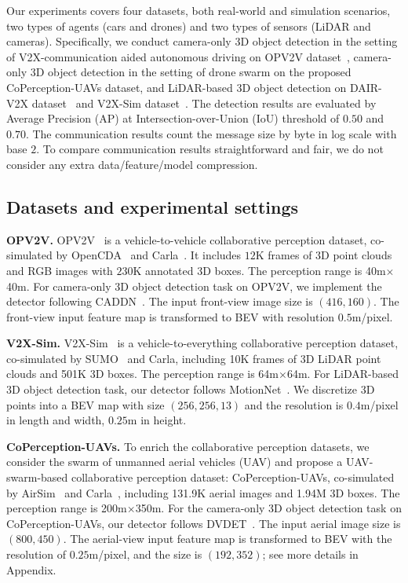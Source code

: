 \documentclass{article}
\begin{document}
Our experiments covers four datasets, both real-world and simulation scenarios, two types of agents (cars and drones) and two types of sensors (LiDAR and cameras). Specifically, we conduct camera-only 3D object detection in the setting of V2X-communication aided autonomous driving on OPV2V dataset~\cite{OPV2V}, camera-only 3D object detection in the setting of drone swarm on the proposed CoPerception-UAVs dataset, and LiDAR-based 3D object detection on DAIR-V2X dataset~\cite{dair} and V2X-Sim dataset~\cite{V2XSim}. The detection results are evaluated by Average Precision (AP) at Intersection-over-Union (IoU) threshold of $0.50$ and $0.70$. The communication results count the message size by byte in log scale with base $2$. To compare communication results straightforward and fair, we do not consider any extra data/feature/model compression.

\vspace{-2mm}
\subsection{Datasets and experimental settings}
\label{sec:ExpDetails}
\vspace{-2mm}
\textbf{OPV2V.}
OPV2V~\cite{OPV2V} is a vehicle-to-vehicle collaborative perception dataset, co-simulated by OpenCDA~\cite{OPV2V} and Carla~\cite{carla}. It includes $12$K frames of 3D point clouds and RGB images with $230$K annotated 3D boxes. The perception range is 40m$\times$40m. For camera-only 3D object detection task on OPV2V, we implement the detector following CADDN~\cite{CaDDN}. The input front-view image size is $(416, 160)$. The front-view input feature map is transformed to BEV with resolution $0.5$m/pixel.


\textbf{V2X-Sim.}
V2X-Sim~\cite{V2XSim} is a vehicle-to-everything collaborative perception dataset, co-simulated by SUMO~\cite{sumo} and Carla, including 10K frames of 3D LiDAR  point clouds and 501K 3D boxes. The perception range is 64m$\times$64m. For LiDAR-based 3D object detection task, our detector follows MotionNet~\cite{Wu2020MotionNetJP}. We discretize 3D points into a BEV map with size  $(256, 256, 13)$ and the resolution is $0.4$m/pixel in length and width, $0.25$m in height.


\textbf{CoPerception-UAVs.}
To enrich the collaborative perception datasets, we consider the swarm of unmanned aerial vehicles (UAV) and propose a UAV-swarm-based collaborative perception dataset: CoPerception-UAVs, co-simulated by AirSim~\cite{Airsim} and Carla~\cite{carla}, including 131.9K aerial images and 1.94M 3D boxes. The perception range is 200m$\times$350m. For the camera-only 3D object detection task on CoPerception-UAVs, our detector follows DVDET~\cite{DVDET}. The input aerial image size is $(800, 450)$. The aerial-view input feature map is transformed to BEV with the resolution of $0.25$m/pixel, and the size is $(192,352)$; see more details in Appendix.
\end{document}
